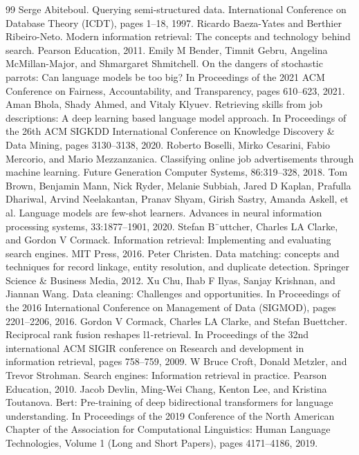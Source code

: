 \begin{thebibliography}{99}
 Serge Abiteboul. Querying semi-structured data. International Conference on Database Theory (ICDT), pages 1--18, 1997.
 Ricardo Baeza-Yates and Berthier Ribeiro-Neto. Modern information retrieval: The concepts and technology behind search. Pearson Education, 2011.
 Emily M Bender, Timnit Gebru, Angelina McMillan-Major, and Shmargaret Shmitchell. On the dangers of stochastic parrots: Can language models be too big? In Proceedings of the 2021 ACM Conference on Fairness, Accountability, and Transparency, pages 610--623, 2021.
 Aman Bhola, Shady Ahmed, and Vitaly Klyuev. Retrieving skills from job descriptions: A deep learning based language model approach. In Proceedings of the 26th ACM SIGKDD International Conference on Knowledge Discovery \& Data Mining, pages 3130--3138, 2020.
 Roberto Boselli, Mirko Cesarini, Fabio Mercorio, and Mario Mezzanzanica. Classifying online job advertisements through machine learning. Future Generation Computer Systems, 86:319--328, 2018.
 Tom Brown, Benjamin Mann, Nick Ryder, Melanie Subbiah, Jared D Kaplan, Prafulla Dhariwal, Arvind Neelakantan, Pranav Shyam, Girish Sastry, Amanda Askell, et al. Language models are few-shot learners. Advances in neural information processing systems, 33:1877--1901, 2020.
 Stefan B¨uttcher, Charles LA Clarke, and Gordon V Cormack. Information retrieval: Implementing and evaluating search engines. MIT Press, 2016.
 Peter Christen. Data matching: concepts and techniques for record linkage, entity resolution, and duplicate detection. Springer Science \& Business Media, 2012.
 Xu Chu, Ihab F Ilyas, Sanjay Krishnan, and Jiannan Wang. Data cleaning: Challenges and opportunities. In Proceedings of the 2016 International Conference on Management of Data (SIGMOD), pages 2201--2206, 2016.
 Gordon V Cormack, Charles LA Clarke, and Stefan Buettcher. Reciprocal rank fusion reshapes l1-retrieval. In Proceedings of the 32nd international ACM SIGIR conference on Research and development in information retrieval, pages 758--759, 2009.
 W Bruce Croft, Donald Metzler, and Trevor Strohman. Search engines: Information retrieval in practice. Pearson Education, 2010.
 Jacob Devlin, Ming-Wei Chang, Kenton Lee, and Kristina Toutanova. Bert: Pre-training of deep bidirectional transformers for language understanding. In Proceedings of the 2019 Conference of the North American Chapter of the Association for Computational Linguistics: Human Language Technologies, Volume 1 (Long and Short Papers), pages 4171--4186, 2019.

\end{thebibliography}
